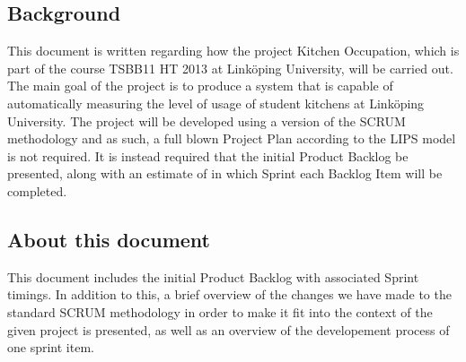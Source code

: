
\subsection{Background}
This document is written regarding how the project Kitchen Occupation, which is part of the course TSBB11 HT 2013 at Linköping University, will be carried out. The main goal of the project is to produce a system that is capable of automatically measuring the level of usage of student kitchens at Linköping University. The project will be developed using a version of the SCRUM methodology and as such, a full blown Project Plan according to the LIPS model is not required. It is instead required that the initial Product Backlog be presented, along with an estimate of in which Sprint each Backlog Item will be completed. 

\subsection{About this document}
 This document includes the initial Product Backlog with associated Sprint timings. In addition to this, a brief overview of the changes we have made to the standard SCRUM methodology in order to make it fit into the context of the given project is presented, as well as an overview of the developement process of one sprint item. 


